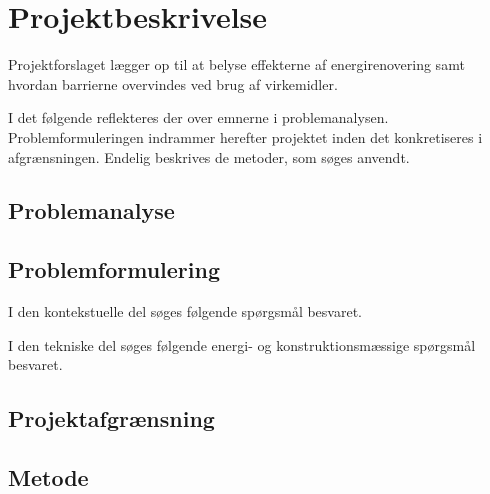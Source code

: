 \chapter{Projektbeskrivelse}

Projektforslaget lægger op til at belyse effekterne af energirenovering samt hvordan barrierne overvindes ved brug af virkemidler. 

I det følgende reflekteres der over emnerne i problemanalysen. Problemformuleringen indrammer herefter projektet inden det konkretiseres i afgrænsningen. Endelig beskrives de metoder, som søges anvendt. 

\section{Problemanalyse}

\section{Problemformulering}

I den kontekstuelle del søges følgende spørgsmål besvaret.

I den tekniske del søges følgende energi- og konstruktionsmæssige spørgsmål besvaret.

\section{Projektafgrænsning}

\section{Metode}